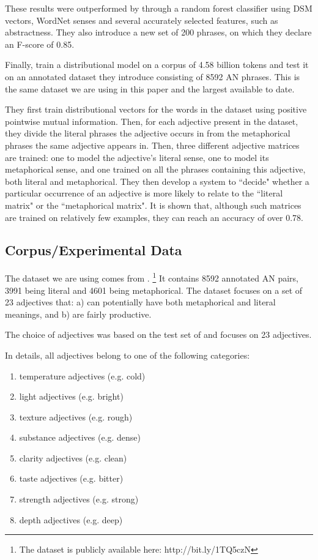 These results were outperformed by \citet{Tsvetkov_metaphordetection} through a random forest classifier using DSM vectors, WordNet senses and several accurately selected features, such as abstractness. They also introduce a new set of 200 phrases, on which they declare an F-score of 0.85.

Finally, \citet{gutierrez2016literal} train a distributional model on a corpus of 4.58 billion tokens and test it on an annotated dataset they introduce consisting of 8592 AN phrases. This is the same dataset we are using in this paper and the largest available to date. 

They first train distributional vectors for the words in the dataset using positive pointwise mutual information.
Then, for each adjective present in the dataset, they divide the literal phrases the adjective occurs in from the metaphorical phrases the same adjective appears in.   Then, three different adjective matrices are trained: one to model the adjective's literal sense, one to model its metaphorical sense, and one trained on all the phrases containing this adjective, both literal and metaphorical. They then develop a system to ``decide" whether a particular occurrence of an adjective is more likely to relate to the ``literal matrix" or the ``metaphorical matrix". It is shown that, although such matrices are trained on relatively few examples, they can reach an accuracy of over 0.78.  


\subsection{Corpus/Experimental Data}


The dataset we are using comes from \cite{gutierrez2016literal}. \footnote{The dataset is publicly available here:  http://bit.ly/1TQ5czN} It contains 8592 annotated
AN pairs, 3991 being literal and 4601 being metaphorical. The dataset focuses on a set of 23 adjectives that: a) can potentially have both metaphorical and literal meanings, and b) are fairly productive.

The choice of adjectives was based on the test set of \cite{Tsvetkov_metaphordetection} and focuses on 23 adjectives.

In details, all adjectives belong to one of the following categories: 
\begin{enumerate}[topsep=0em,itemsep=0em,partopsep=0em,parsep=0em]
\item  temperature adjectives (e.g. cold)
\item  light adjectives (e.g. bright)
\item  texture adjectives (e.g. rough)
\item  substance adjectives (e.g. dense)
\item  clarity adjectives (e.g. clean)
\item  taste adjectives (e.g. bitter)
\item  strength adjectives (e.g. strong)
\item   depth adjectives (e.g. deep)
\end{enumerate}

